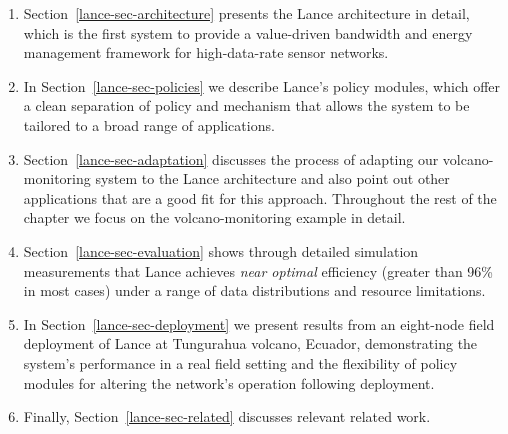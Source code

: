 \begin{enumerate}

\item Section~\ref{lance-sec-architecture} presents the Lance architecture in
detail, which is the first system to provide a value-driven bandwidth and
energy management framework for high-data-rate sensor networks.

\item In Section~\ref{lance-sec-policies} we describe Lance's policy modules,
which offer a clean separation of policy and mechanism that allows the system
to be tailored to a broad range of applications.

\item Section~\ref{lance-sec-adaptation} discusses the process of
adapting our volcano-monitoring system to the Lance architecture and also
point out other applications that are a good fit for this approach.
Throughout the rest of the chapter we focus on the volcano-monitoring example
in detail.

\item Section~\ref{lance-sec-evaluation} shows through detailed simulation
measurements that Lance achieves \textit{near optimal} efficiency (greater
than 96\% in most cases) under a range of data distributions and resource
limitations.

\item In Section~\ref{lance-sec-deployment} we present results from an
eight-node field deployment of Lance at Tungurahua volcano, Ecuador,
demonstrating the system's performance in a real field setting and the
flexibility of policy modules for altering the network's operation following
deployment.

\item Finally, Section~\ref{lance-sec-related} discusses relevant related
work.

\end{enumerate}
